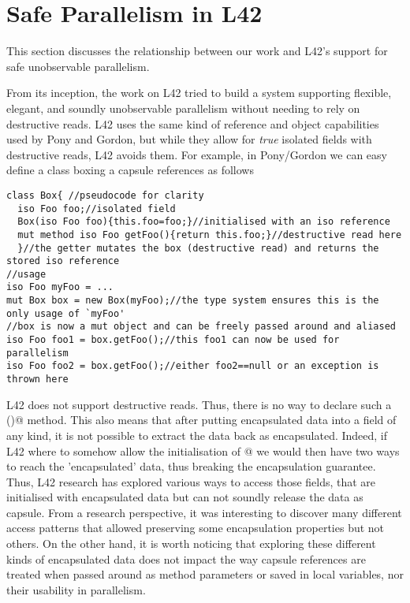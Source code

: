 \section{Safe Parallelism in L42}
\label{s:parallelism}

This section discusses the relationship between our work and L42's support for safe unobservable parallelism.

From its inception, the work on L42 tried to build a system supporting flexible, elegant, and soundly unobservable parallelism without needing to rely on destructive reads.
L42 uses  the same kind of reference and object capabilities used by Pony and Gordon, but while they allow for \emph{true} isolated fields with destructive reads, L42 avoids them.
For example, in Pony/Gordon we can easy define a class boxing a capsule references as follows
\begin{lstlisting}[morekeywords={iso}]
class Box{ //pseudocode for clarity
  iso Foo foo;//isolated field
  Box(iso Foo foo){this.foo=foo;}//initialised with an iso reference
  mut method iso Foo getFoo(){return this.foo;}//destructive read here
  }//the getter mutates the box (destructive read) and returns the stored iso reference
//usage
iso Foo myFoo = ...
mut Box box = new Box(myFoo);//the type system ensures this is the only usage of `myFoo'
//box is now a mut object and can be freely passed around and aliased
iso Foo foo1 = box.getFoo();//this foo1 can now be used for parallelism
iso Foo foo2 = box.getFoo();//either foo2==null or an exception is thrown here
\end{lstlisting}
L42 does not support destructive reads. Thus, there is no way to declare such a \Q@getFoo()@ method.
This also means that after putting encapsulated data into a field of any kind, it is not possible to extract the data back as encapsulated.
Indeed, if L42 where to somehow allow the initialisation of @ we would then have two ways to reach the 'encapsulated' data, thus breaking the encapsulation guarantee.
Thus, L42 research has explored various ways to access those fields, that are initialised with encapsulated data but can not soundly release the data as capsule.
From a research perspective, it was interesting to discover many different access patterns that allowed preserving some encapsulation properties but not others.
On the other hand, it is worth noticing that exploring these different kinds of encapsulated data does not impact the way capsule references are treated when passed around as method parameters or saved in local variables, nor their usability in parallelism.

